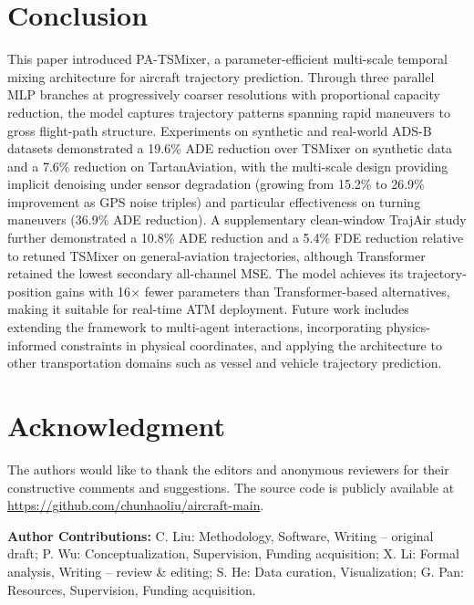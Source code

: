 \documentclass[letterpaper,journal]{IEEEtran}
\begin{document}
\section{Conclusion}
This paper introduced PA-TSMixer, a parameter-efficient multi-scale temporal mixing
architecture for aircraft trajectory prediction. Through three parallel MLP branches
at progressively coarser resolutions with proportional capacity reduction, the model
captures trajectory patterns spanning rapid maneuvers to gross flight-path structure.
Experiments on synthetic and real-world ADS-B datasets demonstrated a 19.6\% ADE
reduction over TSMixer on synthetic data and a 7.6\% reduction on TartanAviation,
with the multi-scale design providing implicit denoising under sensor degradation
(growing from 15.2\% to 26.9\% improvement as GPS noise triples) and particular
effectiveness on turning maneuvers (36.9\% ADE reduction). A supplementary
clean-window TrajAir study further demonstrated a 10.8\% ADE reduction and a
5.4\% FDE reduction relative to retuned TSMixer on general-aviation trajectories,
although Transformer retained the lowest secondary all-channel MSE. The model
achieves its trajectory-position gains with 16$\times$ fewer parameters than
Transformer-based alternatives, making it suitable for real-time ATM deployment.
Future work includes extending the framework to multi-agent interactions,
incorporating physics-informed constraints in physical coordinates, and applying
the architecture to other transportation domains such as vessel and vehicle
trajectory prediction.

\section*{Acknowledgment}
The authors would like to thank the editors and anonymous reviewers for their
constructive comments and suggestions. The source code is publicly available at
\url{https://github.com/chunhaoliu/aircraft-main}.

\textbf{Author Contributions:} C. Liu: Methodology, Software, Writing -- original
draft; P. Wu: Conceptualization, Supervision, Funding acquisition; X. Li: Formal
analysis, Writing -- review \& editing; S. He: Data curation, Visualization;
G. Pan: Resources, Supervision, Funding acquisition.
\end{document}
